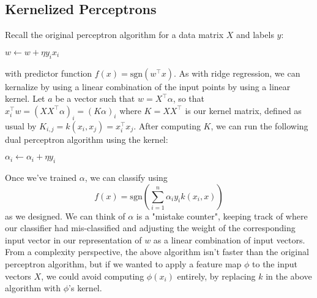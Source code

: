 \subsection{Kernelized Perceptrons}
Recall the original perceptron algorithm for a data matrix $ X $ and labels $ y $:
\begin{algorithmic}
            \State $ w \gets w + \eta y_i x_i $
        \EndWhile
    \EndProcedure
\end{algorithmic}
with predictor function $ f(x) = \text{sgn}(w^\intercal x) $. As with ridge regression, we can kernalize by using a linear combination of the input points by using a linear kernel. Let $ a $ be a vector such that $ w = X^\intercal \alpha $, so that $ x_i^\intercal w = (X X^\intercal \alpha)_i = (K \alpha)_i $ where $ K = X X^\intercal $ is our kernel matrix, defined as usual by $ K_{i, j} = k(x_i, x_j) = x_i^\intercal x_j $. After computing $ K $, we can run the following dual perceptron algorithm using the kernel:
\begin{algorithmic}
            \State $ \alpha_i \gets \alpha_i + \eta y_i $
        \EndWhile
    \EndProcedure
\end{algorithmic}
Once we've trained $ \alpha $, we can classify using
$$ f(x) = \text{sgn} \left( \sum_{i = 1}^n \alpha_i y_i k(x_i, x) \right) $$
as we designed. We can think of $ \alpha $ is a "mistake counter", keeping track of where our classifier had mis-classified and adjusting the weight of the corresponding input vector in our representation of $ w $ as a linear combination of input vectors. From a complexity perspective, the above algorithm isn't faster than the original perceptron algorithm, but if we wanted to apply a feature map $ \phi $ to the input vectors $ X $, we could avoid computing $ \phi(x_i) $ entirely, by replacing $ k $ in the above algorithm with $ \phi $'s kernel.

